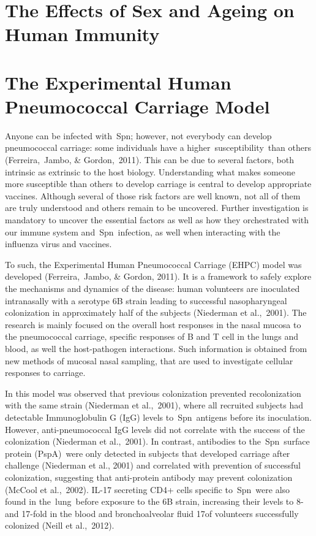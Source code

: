 \documentclass[
]{book}
\begin{document}
\hypertarget{the-effects-of-sex-and-ageing-on-human-immunity}{%
\section{The Effects of Sex and Ageing on Human Immunity}\label{the-effects-of-sex-and-ageing-on-human-immunity}}

\hypertarget{the-experimental-human-pneumococcal-carriage-model}{%
\section{The Experimental Human Pneumococcal Carriage Model}\label{the-experimental-human-pneumococcal-carriage-model}}

Anyone can be infected with~Spn; however, not everybody can develop pneumococcal carriage: some individuals have a higher~susceptibility~than others (Ferreira,~Jambo, \& Gordon,~2011)⁠. This can be due to several factors, both intrinsic as extrinsic to the host biology. Understanding what makes someone more susceptible than others to develop carriage is central to develop appropriate vaccines. Although several of those risk factors are well known, not all of them are truly understood and others remain to be uncovered. Further investigation is mandatory to uncover the essential factors as well as how they orchestrated with our immune system and~Spn~infection, as well when interacting with the influenza virus and vaccines.

To such, the Experimental Human Pneumococcal Carriage (EHPC) model ⁠was developed (Ferreira,~Jambo, \& Gordon, 2011). It is a framework to safely explore the mechanisms and dynamics of the disease: human volunteers are inoculated intranasally with a serotype 6B strain leading to successful nasopharyngeal colonization in approximately half of the subjects (Niederman et al.,~2001)⁠. The research is mainly focused on the overall host responses in the nasal mucosa to the pneumococcal carriage, specific responses of B and T cell in the lungs and blood, as well the host-pathogen interactions. Such information is obtained from new methods of mucosal nasal sampling, that are used to investigate cellular responses to carriage.

In this model was observed that previous colonization prevented recolonization with the same strain (Niederman et al.,~2001)⁠, where all recruited subjects had detectable Immunoglobulin G (IgG) levels to~Spn~antigens before its inoculation. However, anti-pneumococcal IgG levels did not correlate with the success of the colonization (Niederman et al.,~2001)⁠. In contrast, antibodies to the~Spn~surface protein (PspA)~were only detected in subjects that developed carriage after challenge (Niederman et al., 2001) and correlated with prevention of successful colonization, suggesting that anti-protein antibody may prevent colonization (McCool et al.,~2002)⁠. IL-17 secreting CD4+ cells specific to~Spn~were also found in the~lung~before exposure to the 6B strain, increasing their levels to 8- and 17-fold in the blood and bronchoalveolar fluid 17of volunteers successfully colonized (Neill et al.,~2012)⁠.
\end{document}
